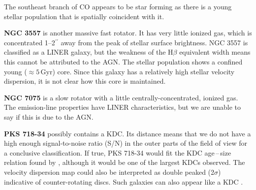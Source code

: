 The southeast branch of CO appears to be star forming as there is a young stellar population that is spatially coincident with it.

\textbf{NGC 3557} is another massive fast rotator. It has very little ionized gas, which is concentrated 1--2$^{\prime\prime}$ away from the peak of stellar surface brightness. NGC 3557 is classified as a LINER galaxy, but the weakness of the H$\beta$ equivalent width means this cannot be attributed to the AGN. The stellar population shows a confined young ($\approx 5$\,Gyr) core. Since this galaxy has a relatively high stellar velocity dispersion, it is not clear how this core is maintained. 

\textbf{NGC 7075} is a slow rotator with a little centrally-concentrated, ionized gas. The emission-line properties have LINER characteristics, but we are unable to say if this is due to the AGN.

\textbf{PKS 718-34} possibly contains a KDC. Its distance means that we do not have a high enough signal-to-noise ratio (S/N) in the outer parts of the field of view for a conclusive classification. If true, PKS 718-34 would fit the KDC age\,--\,size relation found by \citet{Kuntschner2010}, although it would be one of the largest KDCs observed. The velocity dispersion map could also be interpreted as double peaked (2$\sigma$) indicative of counter-rotating discs. Such galaxies can also appear like a KDC \citep[e.g.][]{Bois2011}.
